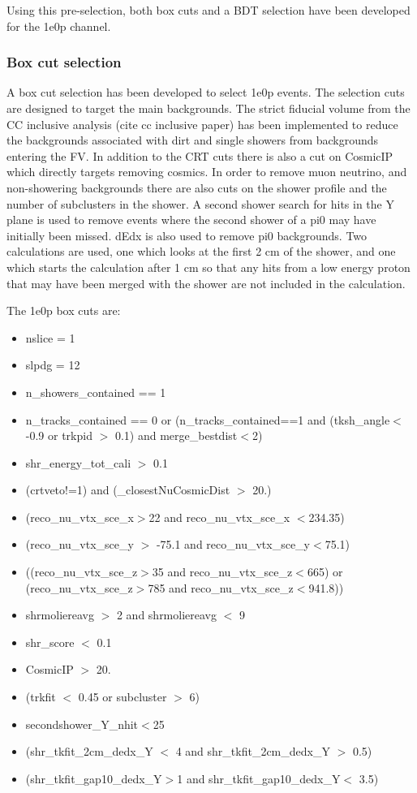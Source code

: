 \documentclass[a4paper]{article}
\begin{document}
Using this pre-selection, both box cuts and a BDT selection have been developed for the 1e0p channel.

\subsubsection{Box cut selection}

A box cut selection has been developed to select 1e0p events.  The selection cuts are designed to target the main backgrounds.  The strict fiducial volume from the CC inclusive analysis (cite cc inclusive paper) has been implemented to reduce the backgrounds associated with dirt and single showers from backgrounds entering the FV.   In addition to the CRT cuts there is also a cut on CosmicIP which directly targets removing cosmics.  In order to remove muon neutrino, and non-showering backgrounds there are also cuts on the shower profile and the number of subclusters in the shower.  A second shower search for hits in the Y plane is used to remove events where the second shower of a pi0 may have initially been missed.  dEdx is also used to remove pi0 backgrounds.  Two calculations are used, one which looks at the first 2 cm of the shower, and one which starts the calculation after 1 cm so that any hits from a low energy proton that may have been merged with the shower are not included in the calculation.

The 1e0p box cuts are:

\begin{itemize}
    \item nslice = 1
    \item slpdg = 12
    \item n\_showers\_contained == 1
    \item n\_tracks\_contained == 0 or (n\_tracks\_contained==1 and (tksh\_angle$<$-0.9 or trkpid $>$ 0.1) and merge\_bestdist$<$2)
    \item shr\_energy\_tot\_cali $>$ 0.1
    \item (crtveto!=1) and (\_closestNuCosmicDist $>$ 20.)
    \item (reco\_nu\_vtx\_sce\_x$>$22 and reco\_nu\_vtx\_sce\_x $<$234.35)
    \item (reco\_nu\_vtx\_sce\_y $>$ -75.1 and reco\_nu\_vtx\_sce\_y$<$75.1)
    \item ((reco\_nu\_vtx\_sce\_z$>$35 and reco\_nu\_vtx\_sce\_z$<$665) or (reco\_nu\_vtx\_sce\_z$>$785 and reco\_nu\_vtx\_sce\_z$<$941.8))
    \item shrmoliereavg $>$ 2 and shrmoliereavg $<$ 9
    \item shr\_score $<$ 0.1
    \item CosmicIP $>$ 20.
    \item (trkfit $<$ 0.45 or subcluster $>$ 6)
    \item secondshower\_Y\_nhit$<$25
    \item (shr\_tkfit\_2cm\_dedx\_Y $<$ 4 and shr\_tkfit\_2cm\_dedx\_Y $>$ 0.5)
    \item (shr\_tkfit\_gap10\_dedx\_Y$>$1 and shr\_tkfit\_gap10\_dedx\_Y$<$ 3.5)
\end{itemize}
\end{document}
